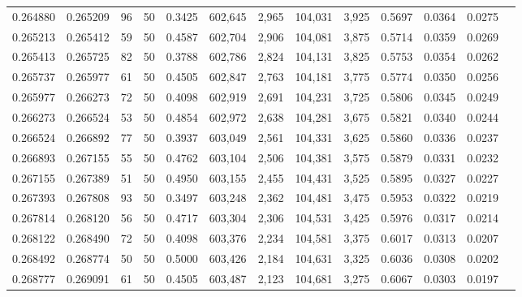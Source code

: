 \begin{tabular}{rrrrrrrrrrrrr}
0.264880 & 0.265209 &    96 &  50 &                                     0.3425 & 602,645 &   2,965 & 104,031 &   3,925 & 0.5697 & 0.0364 & 0.0275 \\
0.265213 & 0.265412 &    59 &  50 &                                     0.4587 & 602,704 &   2,906 & 104,081 &   3,875 & 0.5714 & 0.0359 & 0.0269 \\
0.265413 & 0.265725 &    82 &  50 &                                     0.3788 & 602,786 &   2,824 & 104,131 &   3,825 & 0.5753 & 0.0354 & 0.0262 \\
0.265737 & 0.265977 &    61 &  50 &                                     0.4505 & 602,847 &   2,763 & 104,181 &   3,775 & 0.5774 & 0.0350 & 0.0256 \\
0.265977 & 0.266273 &    72 &  50 &                                     0.4098 & 602,919 &   2,691 & 104,231 &   3,725 & 0.5806 & 0.0345 & 0.0249 \\
0.266273 & 0.266524 &    53 &  50 &                                     0.4854 & 602,972 &   2,638 & 104,281 &   3,675 & 0.5821 & 0.0340 & 0.0244 \\
0.266524 & 0.266892 &    77 &  50 &                                     0.3937 & 603,049 &   2,561 & 104,331 &   3,625 & 0.5860 & 0.0336 & 0.0237 \\
0.266893 & 0.267155 &    55 &  50 &                                     0.4762 & 603,104 &   2,506 & 104,381 &   3,575 & 0.5879 & 0.0331 & 0.0232 \\
0.267155 & 0.267389 &    51 &  50 &                                     0.4950 & 603,155 &   2,455 & 104,431 &   3,525 & 0.5895 & 0.0327 & 0.0227 \\
0.267393 & 0.267808 &    93 &  50 &                                     0.3497 & 603,248 &   2,362 & 104,481 &   3,475 & 0.5953 & 0.0322 & 0.0219 \\
0.267814 & 0.268120 &    56 &  50 &                                     0.4717 & 603,304 &   2,306 & 104,531 &   3,425 & 0.5976 & 0.0317 & 0.0214 \\
0.268122 & 0.268490 &    72 &  50 &                                     0.4098 & 603,376 &   2,234 & 104,581 &   3,375 & 0.6017 & 0.0313 & 0.0207 \\
0.268492 & 0.268774 &    50 &  50 &                                     0.5000 & 603,426 &   2,184 & 104,631 &   3,325 & 0.6036 & 0.0308 & 0.0202 \\
0.268777 & 0.269091 &    61 &  50 &                                     0.4505 & 603,487 &   2,123 & 104,681 &   3,275 & 0.6067 & 0.0303 & 0.0197 \\

\end{tabular}
